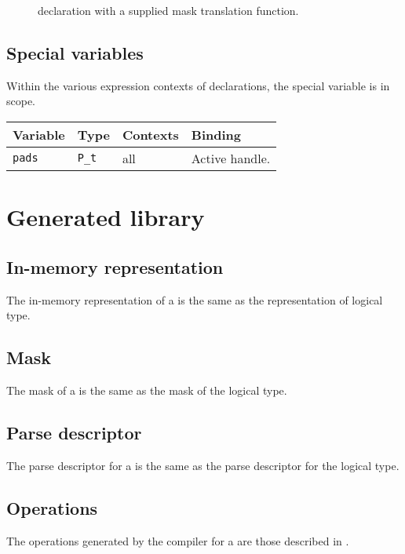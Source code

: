 \begin{figure}
\caption{\Ptrans{} declaration with a supplied mask translation function.}
\label{fig:trans-hex32withMask}
\end{figure}



\subsection{Special variables}
\label{sec:trans-special-variables}
Within the various expression contexts of \Ptrans{} declarations, 
the special variable  is in scope.

\myvskip{1ex}
\begin{center}
\begin{tabular}{|l|l|l|l|}
\hline
Variable & Type & Contexts & Binding \\\hline \hline
\texttt{pads}  & \texttt{P\_t}     & all & Active \pads{} handle. \\ \hline
\end{tabular}
\end{center}
\myvskip{1ex}


\section{Generated library}
\subsection{In-memory representation}
\label{sec:trans-rep}
The in-memory representation of a \ptrans{} is the same as the
representation of logical type.

\subsection{Mask}
\label{sec:trans-masks}
The mask of a \ptrans{} is the same as the
mask of the logical type.

\subsection{Parse descriptor}
\label{sec:trans-parse-descriptors}
The parse descriptor for a \Ptrans{} is the same as the parse
descriptor for the logical type.

\subsection{Operations}
The operations generated by the \pads{} compiler for a \Ptrans{} are
those described in .


